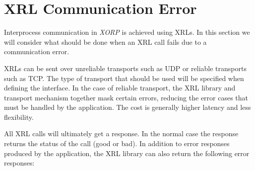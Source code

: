 \documentclass[11pt]{article}
\makeatletter
\newcommand{\xorp} {{\em XORP}\@\xspace}
\makeatother
\begin{document}
\section{XRL Communication Error}
Interprocess communication in \xorp is achieved using XRLs. In this
section we will consider what should be done when an XRL call fails
due to a communication error.

XRLs can be sent over unreliable transports such as UDP or reliable
transports such as TCP. The type of transport that should be used will
be specified when defining the interface. In the case of reliable
transport, the XRL library and transport mechanism together mask certain
errors, reducing the error cases that must be handled by the application.
The cost is generally higher latency and less flexibility.

All XRL calls will ultimately get a response. In the normal case the
response returns the status of the call (good or bad). In addition to
error responses produced by the application, the XRL library can also
return the following error responses:
\end{document}
